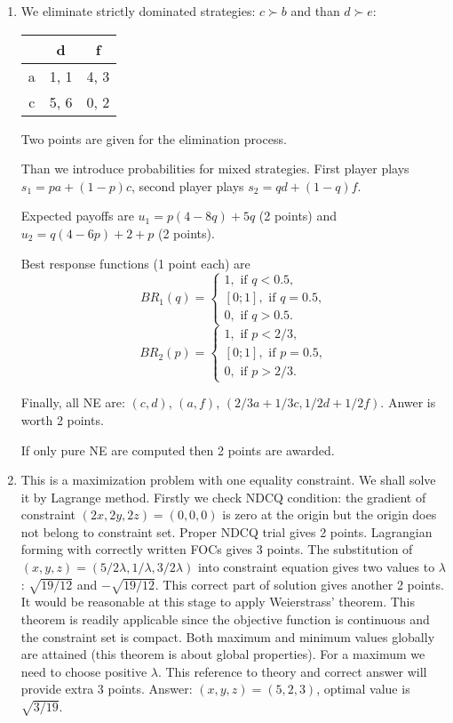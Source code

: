 \documentclass[12pt]{article} %
\theoremstyle{definition} %
\begin{document}
\begin{enumerate}
\newpage
\item We eliminate strictly dominated strategies: $c \succ b$ and than $d \succ e$:

\begin{tabular}{c|cc}
    & d & f \\
 \midrule
 a & 1, 1 &  4, 3 \\
 c & 5, 6 &  0, 2 \\
  \end{tabular}

Two points are given for the elimination process.

Than we introduce probabilities for mixed strategies. 
First player plays $s_1 = pa + (1-p)c$, second player plays $s_2 = qd + (1-q)f$.

Expected payoffs are $u_1 = p(4-8q) + 5q$ (2 points) and $u_2 = q(4-6p)+2+p$ (2 points).

Best response functions (1 point each) are 
\[
  BR_1(q) =  \begin{cases}
    1, \text{ if } q < 0.5, \\
    [0;1], \text{ if } q = 0.5, \\
    0, \text{ if } q > 0.5.
  \end{cases}
\]
\[
  BR_2(p) =  \begin{cases}
    1, \text{ if } p < 2/3, \\
    [0;1], \text{ if } p = 0.5, \\
    0, \text{ if } p > 2/3.
  \end{cases}
\]

Finally, all NE are: $(c, d)$, $(a, f)$, $(2/3 a + 1/3 c, 1/2 d + 1/2f)$. 
Anwer is worth 2 points.

If only pure NE are computed then 2 points are awarded.
 

\item This is a maximization problem with one equality constraint. 
We shall solve it by Lagrange method. 
Firstly we check NDCQ condition: 
the gradient of constraint $(2x, 2y, 2z) = (0, 0, 0)$ is zero at the origin 
but the origin does not belong to constraint set. 
Proper NDCQ trial gives 2 points. 
Lagrangian forming with correctly written FOCs gives 3 points. 
The substitution of $(x, y, z) = (5/2\lambda, 1/\lambda, 3/2\lambda)$ 
into constraint equation gives two values to $\lambda$: $\sqrt{19/12}$ and $-\sqrt{19/12}$. 
This correct part of solution gives another 2 points. 
It would be reasonable at this stage to apply Weierstrass’ theorem. 
This theorem is readily applicable since 
the objective function is continuous and the constraint set is compact. 
Both maximum and minimum values globally are attained 
(this theorem is about global properties). 
For a maximum we need to choose positive $\lambda$. 
This reference to theory and correct answer will provide extra 3 points. 
Answer: $(x, y, z) = (5, 2, 3)$, optimal value is $\sqrt{3/19}$.


\end{enumerate}
\end{document}

